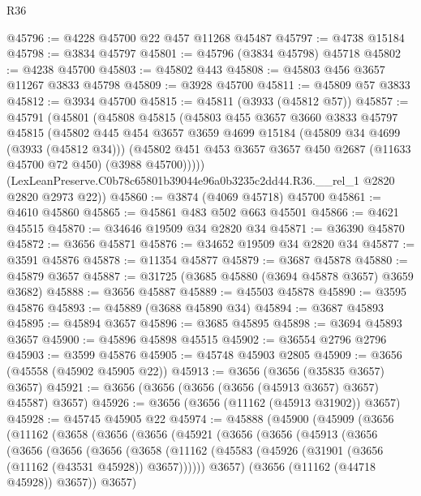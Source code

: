 \begin{lexlean}{R36}
\begin{coremodule}
@45796 := @4228 @45700 @22 @457 @11268 @45487
@45797 := @4738 @15184
@45798 := @3834 @45797
@45801 := @45796 (@3834 @45798) @45718
@45802 := @4238 @45700
@45803 := @45802 @443
@45808 := @45803 @456 @3657 @11267 @3833 @45798
@45809 := @3928 @45700
@45811 := @45809 @57 @3833
@45812 := @3934 @45700
@45815 := @45811 (@3933 (@45812 @57))
@45857 := @45791
    (@45801
      (@45808
        @45815
        (@45803
          @455
          @3657
          @3660
          @3833
          @45797
          @45815
          (@45802
            @445
            @454
            @3657
            @3659
            @4699
            @15184
            (@45809 @34 @4699 (@3933 (@45812 @34)))
            (@45802 @451 @453 @3657 @3657 @450 @2687 (@11633 @45700 @72 @450) (@3988 @45700)))))
      (LexLeanPreserve.C0b78c65801b39044e96a0b3235c2dd44.R36.__rel_1 @2820 @2820 @2973 @22))
@45860 := @3874 (@4069 @45718) @45700
@45861 := @4610 @45860
@45865 := @45861 @483 @502 @663 @45501
@45866 := @4621 @45515
@45870 := @34646 @19509 @34 @2820 @34
@45871 := @36390 @45870
@45872 := @3656 @45871
@45876 := @34652 @19509 @34 @2820 @34
@45877 := @3591 @45876
@45878 := @11354 @45877
@45879 := @3687 @45878
@45880 := @45879 @3657
@45887 := @31725 (@3685 @45880 (@3694 @45878 @3657) @3659 @3682)
@45888 := @3656 @45887
@45889 := @45503 @45878
@45890 := @3595 @45876
@45893 := @45889 (@3688 @45890 @34)
@45894 := @3687 @45893
@45895 := @45894 @3657
@45896 := @3685 @45895
@45898 := @3694 @45893 @3657
@45900 := @45896 @45898 @45515
@45902 := @36554 @2796 @2796
@45903 := @3599 @45876
@45905 := @45748 @45903 @2805
@45909 := @3656 (@45558 (@45902 @45905 @22))
@45913 := @3656 (@3656 (@35835 @3657) @3657)
@45921 := @3656 (@3656 (@3656 (@3656 (@45913 @3657) @3657) @45587) @3657)
@45926 := @3656 (@3656 (@11162 (@45913 @31902)) @3657)
@45928 := @45745 @45905 @22
@45974 := @45888
    (@45900
      (@45909
        (@3656
          (@11162
            (@3658
              (@3656
                (@3656
                  (@45921
                    (@3656
                      (@3656
                        (@45913
                          (@3656
                            (@3656
                              (@3656
                                (@3656
                                  (@3658
                                    (@11162
                                      (@45583
                                        (@45926 (@31901 (@3656 (@11162 (@43531 @45928)) @3657))))))
                                  @3657)
                                (@3656 (@11162 (@44718 @45928)) @3657))
                              @3657)

\end{coremodule}
\end{lexlean}
